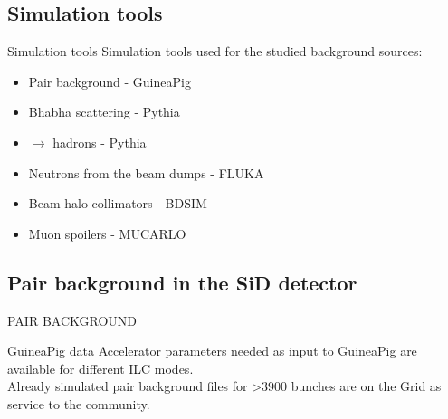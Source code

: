 \documentclass[xcolor={dvipsnames}]{beamer}
\begin{document}
\subsection{Simulation tools}
\begin{frame}{Simulation tools}
Simulation tools used for the studied background sources:
\vspace*{0.5cm}
  \begin{itemize}
    \item Pair background - \alert{GuineaPig}
    \item Bhabha scattering - \alert{Pythia}
    \item \textgamma \textgamma $\rightarrow$ hadrons - \alert{Pythia}
    \item Neutrons from the beam dumps - \alert{FLUKA}
    \item Beam halo collimators - \alert{BDSIM}
    \item Muon spoilers - \alert{MUCARLO}
  \end{itemize}
\end{frame}

\subsection{Pair background in the SiD detector}
\begin{frame}
 \begin{center}
  \alert{\MakeUppercase{Pair background}}
 \end{center}
\end{frame}

\begin{frame}{GuineaPig data}
Accelerator parameters needed as input to GuineaPig are available for different ILC modes.\\
Already simulated pair background files for >3900 bunches are on the Grid as service to the community.\cite{Grid}\\
\end{frame}
\end{document}
